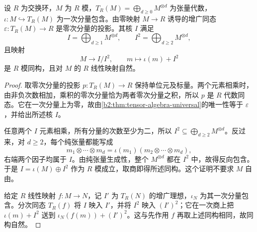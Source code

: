 \begin{proposition}\label{b2:prop:tensor-augmentation-indecomposables}
	设 \(R\) 为交换环，\(M\) 为 \(R\) 模，\(T_R(M)=\bigoplus_{d\ge0}M^{\otimes d}\) 为张量代数，\(\iota:M\hookrightarrow T_R(M)\) 为一次分量包含。由零映射 \(M\rightarrow R\) 诱导的增广同态 \(\varepsilon:T_R(M)\rightarrow R\) 是零次分量的投影。其核 \(I\) 满足
	\[
		I=\bigoplus_{d\ge1}M^{\otimes d}, \qquad I^2=\bigoplus_{d\ge2}M^{\otimes d},
	\]
	且映射
	\[
		M\longrightarrow I/I^2, \qquad m\longmapsto\iota(m)+I^2
	\]
	是 \(R\) 模同构，且对 \(M\) 的 \(R\) 线性映射自然。
\end{proposition}
\begin{proof}
	取零次分量的投影 \(p:T_R(M)\rightarrow R\) 保持单位元及标量。两个元素相乘时，由非负次数相加，乘积的零次分量恰为两者零次分量之积，所以 \(p\) 是 \(R\) 代数同态。它在一次分量上为零，故由\cref{b2:thm:tensor-algebra-universal}的唯一性等于 \(\varepsilon\)，并给出所述核 \(I\)。

	任意两个 \(I\) 元素相乘，所有分量的次数至少为二，所以 \(I^2\subseteq\bigoplus_{d\ge2}M^{\otimes d}\)。反过来，对 \(d\ge2\)，每个纯张量都能写成
	\[
		m_1\otimes\cdots\otimes m_d =\iota(m_1)(m_2\otimes\cdots\otimes m_d),
	\]
	右端两个因子均属于 \(I\)。由纯张量生成性，整个 \(M^{\otimes d}\) 都在 \(I^2\) 中，故得反向包含。于是 \(I=\iota(M)\oplus I^2\) 作为 \(R\) 模成立，取商即得所述同构。这个证明不要求 \(M\) 自由。

	给定 \(R\) 线性映射 \(f:M\rightarrow N\)，记 \(I'\) 为 \(T_R(N)\) 的增广理想，\(\iota_N\) 为其一次分量包含。分次同态 \(T_R(f)\) 将 \(I\) 映入 \(I'\)，并将 \(I^2\) 映入 \((I')^2\)；它在一次商上把 \(\iota(m)+I^2\) 送到 \(\iota_N(f(m))+(I')^2\)。这与先作用 \(f\) 再取上述同构相同，故同构自然。
\end{proof}
